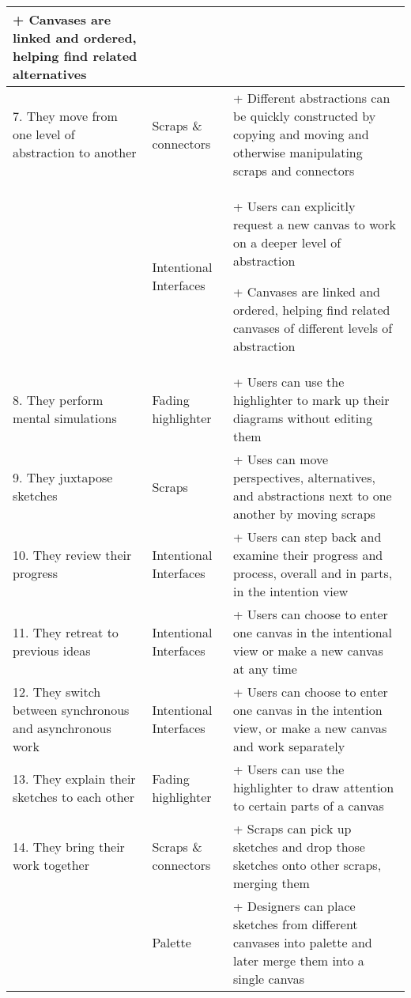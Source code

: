 \begin{center}
\begin{longtable}{|p{4cm}|p{4cm}|p{8cm}|}
+ Canvases are linked and ordered, helping find related alternatives	\\
\hline
7.      They move from one level of abstraction to another	&Scraps \& connectors	& + Different abstractions can be quickly constructed by copying and moving and otherwise manipulating scraps and connectors	\\
\cline{2-3}
	&Intentional Interfaces	& + Users can explicitly request a new canvas to work on a deeper level of abstraction

+ Canvases are linked and ordered, helping find related canvases of different levels of abstraction	\\
\cline{1-3}
8.      They perform mental simulations	& Fading highlighter	& + Users can use the highlighter to mark up their diagrams without editing them	\\
\hline
9.      They juxtapose sketches	&Scraps	& + Uses can move perspectives, alternatives, and abstractions next to one another by moving scraps\\
\cline{1-3}
10.  They review their progress	&Intentional Interfaces	& + Users can step back and examine their progress and process, overall and in parts, in the intention view\\
\hline
11.  They retreat to previous ideas	&Intentional Interfaces	& + Users can choose to enter one canvas in the intentional view or make a new canvas at any time\\
\hline
12.  They switch between synchronous and asynchronous work	&Intentional Interfaces	& + Users can choose to enter one canvas in the intention view, or make a new canvas and work separately\\
\hline
13.  They explain their sketches to each other	& Fading highlighter	& + Users can use the highlighter to draw attention to certain parts of a canvas	\\
\hline
14.  They bring their work together	&Scraps \& connectors	& + Scraps can pick up sketches and drop those sketches onto other scraps, merging them\\
\cline{2-3}
	&Palette	& + Designers can place sketches from different canvases into palette and later merge them into a single canvas
\label{table:discussion:minimally-invasive}
\end{longtable}
\end{center}

